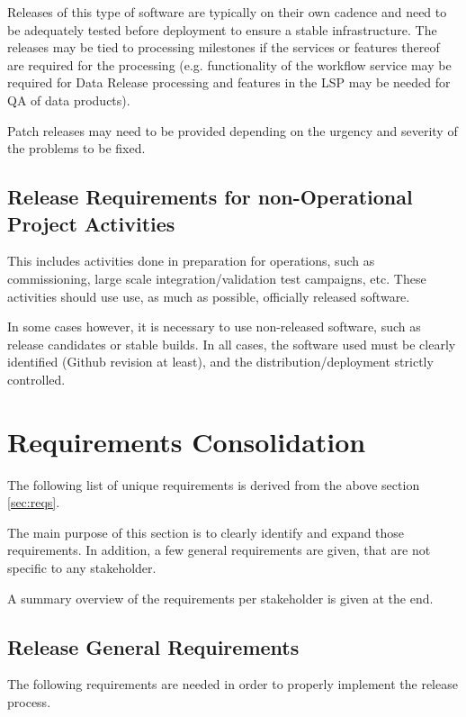 Releases of this type of software are typically on their own cadence and need to be adequately tested before deployment to ensure a stable infrastructure.
The releases may be tied to processing milestones if the services or features thereof are required for the processing (e.g. functionality of the workflow service may be required for \gls{Data Release} processing and features in the \gls{LSP} may be needed for \gls{QA} of data products).

Patch releases may need to be provided depending on the urgency and severity of the problems to be fixed.


\subsection{Release Requirements for non-Operational Project Activities} \label{sec:nonopsreqs}

This includes activities done in preparation for operations, such as commissioning,
large scale integration/validation test campaigns, etc. These activities should use use,  as much as possible,  officially released software.

In some cases however, it is necessary to use non-released software, such as release candidates or stable builds.
In all cases, the software used must be clearly identified (Github revision at least), and the distribution/deployment strictly controlled.


\newpage
\section{Requirements Consolidation} \label{sec:reqdef}

The following list of unique requirements is derived from the above section \ref{sec:reqs}.

The main purpose of this section is to clearly identify and expand those requirements.
In addition, a few general requirements are given, that are not specific to any stakeholder.

A summary overview of the requirements per stakeholder is given at the end.


\subsection{Release General Requirements} \label{sec:genreq}

The following requirements are needed in order to properly implement the release process.


